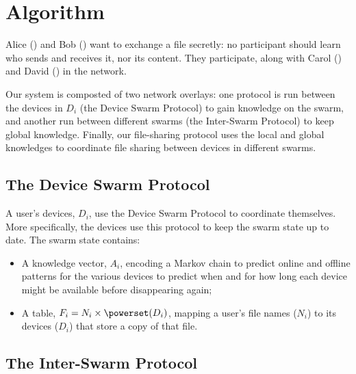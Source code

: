 \section{Algorithm}%
\label{Algorithm}


Alice (\Alice) and Bob (\Bob) want to exchange a file secretly: no participant should learn who sends and receives it, nor its content.
They participate, along with Carol (\Carol) and David (\David) in the \name network. 


Our system is composted of two network overlays: one protocol is run between the 
devices in \(D_i\) (the Device Swarm Protocol) to gain knowledge on the 
swarm, and another run between different swarms (the Inter-Swarm Protocol) to 
keep global knowledge.
Finally, our file-sharing protocol uses the local and global 
knowledges to coordinate file sharing between devices in different swarms.

\subsection{The Device Swarm Protocol}%
\label{DeviceSwarmProtocol}

A user's devices, \(D_i\), use the Device Swarm Protocol to coordinate 
themselves.
More specifically, the devices use this protocol to keep the swarm state up to 
date.
The swarm state contains:
\begin{itemize}
  \item A knowledge vector, \(A_i\), encoding a Markov chain to predict online 
    and offline patterns for the various devices to predict when and for how 
    long each device might be available before disappearing again;
  \item A table, \(F_i = N_i\times \powerset(D_i)\), mapping a user's file names 
    (\(N_i\)) to its devices (\(D_i\)) that store a copy of that file.
\end{itemize}


\subsection{The Inter-Swarm Protocol}%
\label{InterSwarmProtocol}

